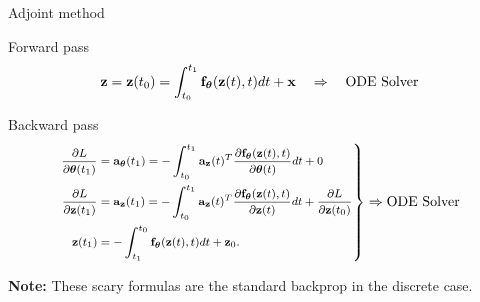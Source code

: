 \begin{frame}{Adjoint method}
	\begin{block}{Forward pass}
		\vspace{-0.3cm}
		\[
		\mathbf{z} = \mathbf{z}(t_0) = \int^{t_1}_{t_0} \mathbf{f}_{\boldsymbol{\theta}}(\mathbf{z}(t), t) d t  + \mathbf{x} \quad \Rightarrow \quad \text{ODE Solver}
		\]
		\vspace{-0.4cm}
	\end{block}
	\begin{block}{Backward pass}
		\vspace{-0.5cm}
		\begin{equation*}
			\left.
			{\footnotesize 
				\begin{aligned}
					\frac{\partial L}{\partial \boldsymbol{\theta}(t_1)} &= \mathbf{a}_{\boldsymbol{\theta}}(t_1) =  - \int_{t_0}^{t_1} \mathbf{a}_{\mathbf{z}}(t)^T \frac{\partial \mathbf{f}_{\boldsymbol{\theta}}(\mathbf{z}(t), t)}{\partial \boldsymbol{\theta}(t)} dt + 0 \\
					\frac{\partial L}{\partial \mathbf{z}(t_1)} &= \mathbf{a}_{\mathbf{z}}(t_1) =  - \int_{t_0}^{t_1} \mathbf{a}_{\mathbf{z}}(t)^T \frac{\partial \mathbf{f}_{\boldsymbol{\theta}}(\mathbf{z}(t), t)}{\partial \mathbf{z}(t)} dt + \frac{\partial L}{\partial \mathbf{z}(t_0)} \\
					\mathbf{z}(t_1) &= - \int^{t_0}_{t_1} \mathbf{f}_{\boldsymbol{\theta}}(\mathbf{z}(t), t) d t  + \mathbf{z}_0.
				\end{aligned}
			}
			\right\rbrace
			\Rightarrow
			\text{ODE Solver}
		\end{equation*}
		\vspace{-0.4cm} 
	\end{block}
	\textbf{Note:} These scary formulas are the standard backprop in the discrete case.
\end{frame}
